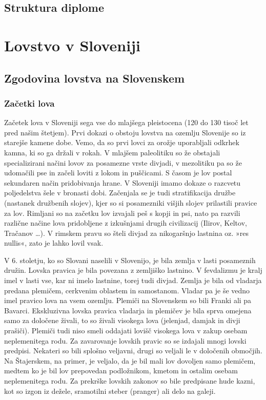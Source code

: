 \documentclass[a4paper,12pt,openright]{book}
\begin{document}
\section{Struktura diplome}

\chapter{Lovstvo v Sloveniji}
\label{zgodovina}

\section{Zgodovina lovstva na Slovenskem}

\subsection{Začetki lova}

Začetek lova v Sloveniji sega vse do mlajšega pleistocena (120 do 130 tisoč let pred našim štetjem). 
Prvi dokazi o obstoju lovstva na ozemlju Slovenije so iz starejše kamene dobe. Vemo, da so prvi lovci za orožje uporabljali odkrhek kamna, ki so ga držali v rokah. 
V mlajšem paleolitiku so že obstajali specializirani načini lovov za posamezne vrste divjadi, v mezolitiku pa so že udomačili pse in začeli loviti z lokom in puščicami. 
S časom je lov postal sekundaren način pridobivanja hrane. 
V Sloveniji imamo dokaze o razcvetu poljedelstva šele v bronasti dobi. Začenjala se je tudi stratifikacija družbe (nastanek družbenih slojev), kjer so si posamezniki višjih slojev prilastili pravice za lov. 
Rimljani so na začetku lov izvajali peš s kopji in psi, nato pa razvili različne načine lova pridobljene z izkušnjami drugih civilizacij (Ilirov, Keltov, Tračanov …). 
V rimskem pravu so šteli divjad za nikogaršnjo lastnina oz. »res nullis«, zato je lahko lovil vsak.

V 6. stoletju, ko so Slovani naselili v Slovenijo, je bila zemlja v lasti posameznih družin. 
Lovska pravica je bila povezana z zemljiško lastnino. 
V fevdalizmu je kralj imel v lasti vse, kar ni imelo lastnine, torej tudi divjad. Zemlja je bila od vladarja predana plemičem, cerkvenim oblastem in samostanom. 
Vladar pa je še vedno imel pravico lova na vsem ozemlju. Plemiči na Slovenskem so bili Franki ali pa Bavarci. 
Ekskluzivna lovska pravica vladarja in plemičev je bila sprva omejena samo za določene živali, to so živali visokega lova (jelenjad, damjak in divji prašiči). 
Plemiči tudi niso smeli oddajati lovišč visokega lova v zakup osebam neplemenitega rodu. Za zavarovanje lovskih pravic so se izdajali mnogi lovski predpisi. 
Nekateri so bili splošno veljavni, drugi so veljali le v določenih območjih. 
Na Štajerskem, na primer, je veljalo, da je bil mali lov dovoljen samo plemičem, medtem ko je bil lov prepovedan podložnikom, kmetom in ostalim osebam neplemenitega rodu. 
Za prekrške lovskih zakonov so bile predpisane hude kazni, kot so izgon iz dežele, sramotilni steber (pranger) ali delo na galeji.
\end{document}
